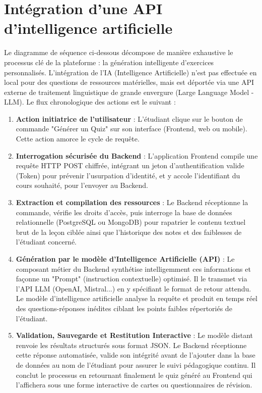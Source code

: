 \documentclass[12pt,a4paper]{report}
\begin{document}
\section{Intégration d'une API d'intelligence artificielle}
Le diagramme de séquence ci-dessous décompose de manière exhaustive le processus clé de la plateforme : la génération intelligente d'exercices personnalisés. L'intégration de l'IA (Intelligence Artificielle) n'est pas effectuée en local pour des questions de ressources matérielles, mais est déportée via une API externe de traitement linguistique de grande envergure (Large Language Model - LLM). Le flux chronologique des actions est le suivant :
\begin{enumerate}
    \item \textbf{Action initiatrice de l'utilisateur} : L'étudiant clique sur le bouton de commande "Générer un Quiz" sur son interface (Frontend, web ou mobile). Cette action amorce le cycle de requête.
    \item \textbf{Interrogation sécurisée du Backend} : L'application Frontend compile une requête HTTP POST chiffrée, intégrant un jeton d'authentification valide (Token) pour prévenir l'usurpation d'identité, et y accole l'identifiant du cours souhaité, pour l'envoyer au Backend.
    \item \textbf{Extraction et compilation des ressources} : Le Backend réceptionne la commande, vérifie les droits d'accès, puis interroge la base de données relationnelle (PostgreSQL ou MongoDB) pour rapatrier le contenu textuel brut de la leçon ciblée ainsi que l'historique des notes et des faiblesses de l'étudiant concerné.
    \item \textbf{Génération par le modèle d'Intelligence Artificielle (API)} : Le composant métier du Backend synthétise intelligemment ces informations et façonne un "Prompt" (instruction contextuelle) optimisé. Il le transmet via l'API LLM (OpenAI, Mistral...) en y spécifiant le format de retour attendu. Le modèle d'intelligence artificielle analyse la requête et produit en temps réel des questions-réponses inédites ciblant les points faibles répertoriés de l'étudiant.
    \item \textbf{Validation, Sauvegarde et Restitution Interactive} : Le modèle distant renvoie les résultats structurés sous format JSON. Le Backend réceptionne cette réponse automatisée, valide son intégrité avant de l'ajouter dans la base de données au nom de l'étudiant pour assurer le suivi pédagogique continu. Il conclut le processus en retournant finalement le quiz généré au Frontend qui l'affichera sous une forme interactive de cartes ou questionnaires de révision.
\end{enumerate}
\end{document}

